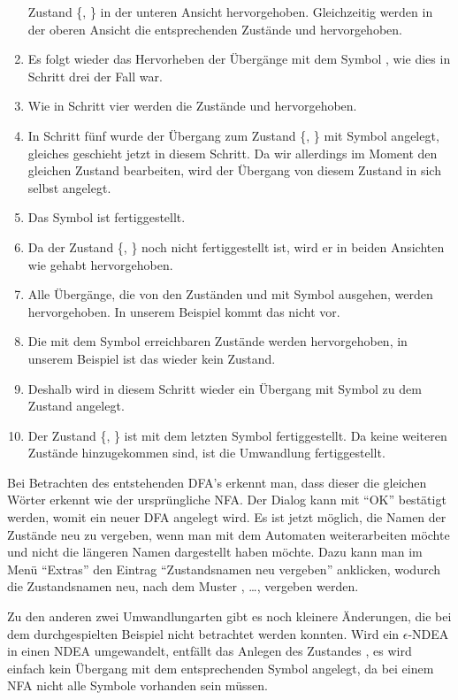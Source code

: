 \begin{enumerate}
  Zustand \{, \} in der unteren Ansicht hervorgehoben.
  Gleichzeitig werden in der oberen Ansicht die entsprechenden Zustände
   und  hervorgehoben.
  \item Es folgt wieder das Hervorheben der Übergänge mit dem Symbol
  , wie dies in Schritt drei der Fall war.
  \item Wie in Schritt vier werden die Zustände  und 
  hervorgehoben.
  \item In Schritt fünf wurde der Übergang zum Zustand \{,
  \} mit Symbol  angelegt, gleiches geschieht jetzt in
  diesem Schritt. Da wir allerdings im Moment den gleichen Zustand bearbeiten,
  wird der Übergang von diesem Zustand in sich selbst angelegt.
  \item Das Symbol  ist fertiggestellt.
  \item Da der Zustand \{, \} noch nicht fertiggestellt
  ist, wird er in beiden Ansichten wie gehabt hervorgehoben.
  \item Alle Übergänge, die von den Zuständen  und  mit
  Symbol  ausgehen, werden hervorgehoben. In unserem Beispiel kommt
  das nicht vor.
  \item Die mit dem Symbol  erreichbaren Zustände werden
  hervorgehoben, in unserem Beispiel ist das wieder kein Zustand.
  \item Deshalb wird in diesem Schritt wieder ein Übergang mit Symbol
   zu dem Zustand \State{$\emptyset$} angelegt.
  \item Der Zustand \{, \} ist mit dem letzten Symbol
   fertiggestellt. Da keine weiteren Zustände hinzugekommen sind, ist
  die Umwandlung fertiggestellt.
\end{enumerate}

Bei Betrachten des entstehenden DFA's erkennt man, dass dieser die gleichen
Wörter erkennt wie der ursprüngliche NFA. Der Dialog kann mit "`OK"' bestätigt
werden, womit ein neuer DFA angelegt wird. Es ist jetzt möglich, die Namen der
Zustände neu zu vergeben, wenn man mit dem Automaten weiterarbeiten möchte und
nicht die längeren Namen dargestellt haben möchte. Dazu kann man im Menü
"`Extras"' den Eintrag "`Zustandsnamen neu vergeben"' anklicken, wodurch die
Zustandsnamen neu, nach dem Muster ,  \ldots, vergeben
werden.\vspace{10pt}

Zu den anderen zwei Umwandlungarten gibt es noch kleinere Änderungen, die bei dem
durchgespielten Beispiel nicht betrachtet werden konnten. Wird ein
$\epsilon$-NDEA in einen NDEA umgewandelt, entfällt das Anlegen des Zustandes
\State{$\emptyset$}, es wird einfach kein Übergang mit dem entsprechenden Symbol
angelegt, da bei einem NFA nicht alle Symbole vorhanden sein
müssen.\vspace{10pt}

